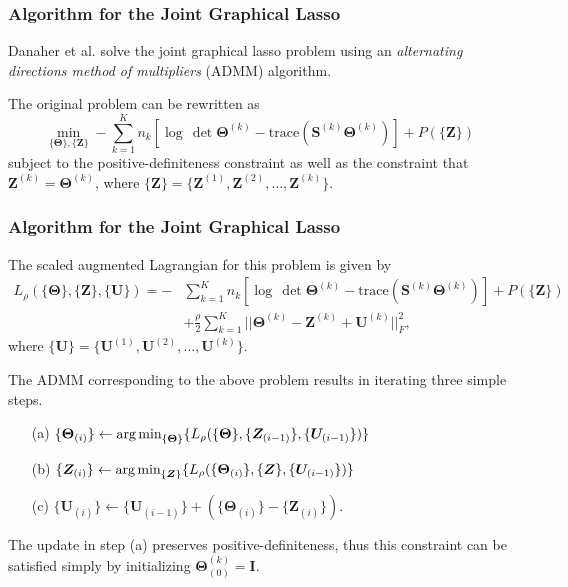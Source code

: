 \documentclass[t]{beamer}
\begin{document}
\begin{frame}
\frametitle{Algorithm for the Joint Graphical Lasso}
Danaher et al. solve the joint graphical lasso problem using an \textit{alternating directions method of multipliers} (ADMM) algorithm.

\bigskip
\pause
The original problem can be rewritten as
\small
\begin{equation*}
\min_{\{\bm{\Theta}\},\{\bm{Z}\}} -\sum_{k=1}^{K}n_{k}\left[\log\,\det \bm{\Theta}^{(k)}-\mbox{trace}\left(\bm{S}^{(k)}\bm{\Theta}^{(k)}\right)\right] + P(\{\bm{Z}\})
\end{equation*}
\normalsize
subject to the positive-definiteness constraint as well as the constraint that $\bm{Z}^{(k)} = \bm{\Theta}^{(k)}$, where $\{\bm{Z}\} = \{\bm{Z}^{(1)},\bm{Z}^{(2)},\ldots,\bm{Z}^{(k)}\}$.
\end{frame}


\begin{frame}
\frametitle{Algorithm for the Joint Graphical Lasso}
The scaled augmented Lagrangian for this problem is given by
\footnotesize
\begin{align*}
L_{\rho}(\{\bm{\Theta}\},\{\bm{Z}\},\{\bm{U}\}) =  -&\sum_{k=1}^{K}n_{k}\left[\log\,\det \bm{\Theta}^{(k)}-\mbox{trace}\left(\bm{S}^{(k)}\bm{\Theta}^{(k)}\right)\right] + P(\{\bm{Z}\}) \\
&+ \frac{\rho}{2}\sum_{k=1}^{K}||\bm{\Theta}^{(k)}-\bm{Z}^{(k)} + \bm{U}^{(k)}||_{F}^{2},
\end{align*}
\normalsize
where $\{\bm{U}\} = \{\bm{U}^{(1)},\bm{U}^{(2)},\ldots,\bm{U}^{(k)}\}$.

\bigskip
\pause
The ADMM corresponding to the above problem results in iterating three simple steps. 
\begin{itemize}
	\item[(a)] $\{\bm{\Theta}_{(i)}\} \leftarrow \mbox{arg\,min}_{\{\bm{\Theta}\}}\{L_{\rho}(\{\bm{\Theta}\},\{\bm{Z}_{(i-1)}\},\{\bm{U}_{(i-1)}\})\}$
	
	\smallskip
	\item[(b)] $\{\bm{Z}_{(i)}\} \leftarrow \mbox{arg\,min}_{\{\bm{Z}\}}\{L_{\rho}(\{\bm{\Theta}_{(i)}\},\{\bm{Z}\},\{\bm{U}_{(i-1)}\})\}$
	
	\smallskip
	\item[(c)] $\{\bm{U}_{(i)}\} \leftarrow \{\bm{U}_{(i-1)}\} + (\{\bm{\Theta}_{(i)}\} - \{\bm{Z}_{(i)}\})$.	
\end{itemize}

\bigskip
\pause
The update in step (a) preserves positive-definiteness, thus this constraint can be satisfied simply by initializing $\bm{\Theta}^{(k)}_{(0)} = \bm{I}$.

\end{frame}
\end{document}
